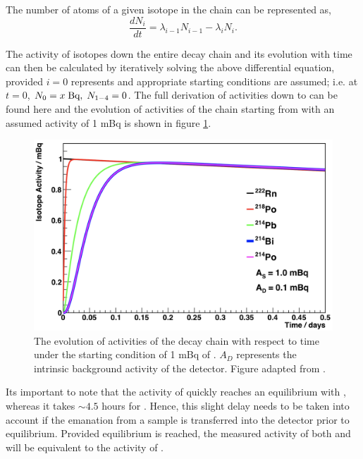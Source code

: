 The number of atoms of a given isotope in the chain can be represented as, 
%
\begin{equation}
    \frac{dN_{i}}{dt} = \lambda_{i-1}N_{i-1} - \lambda_{i}N_{i}.
    \label{eq:isotopic_chance_in_chain}
\end{equation}
%

The activity of isotopes down the entire decay chain and its evolution with time can then be calculated by iteratively solving the above differential equation, provided $i=0$ represents \RnTTT{} and appropriate starting conditions are assumed; i.e. at $t=0$, $N_{0}= x \; \text{Bq}, \; N_{1-4} = 0$. The full derivation of activities down to \PoTOF{} can be found here \cite{mott_2013} and the evolution of activities of the chain starting from \RnTTT{} with an assumed activity of 1 mBq is shown in figure \ref{fig:radon_chain_activity_evolution}.
%
\begin{figure}[t!]
    \centering
    \includegraphics[scale=0.40]{Chapter_4/Figures/radon_chain_activities.png}
    \caption[The evolution of activities of the \RnTTT{} decay chain with respect to time under the starting condition of 1 mBq of \RnTTT{}.]
    {The evolution of activities of the \RnTTT{} decay chain with respect to time under the starting condition of 1 mBq of \RnTTT{}. $A_{D}$ represents the intrinsic background activity of the detector. Figure adapted from \cite{mott_2013}.}
    \label{fig:radon_chain_activity_evolution}
\end{figure}
%
Its important to note that the activity of \PoTOE{} quickly reaches an equilibrium with \RnTTT{}, whereas it takes $\sim4.5$ hours for \PoTOF{}. Hence, this slight delay needs to be taken into account if the emanation from a sample is transferred into the detector prior to equilibrium. Provided equilibrium is reached, the measured activity of both \PoTOE{} and \PoTOF{} will be equivalent to the activity of \RnTTT{}.


